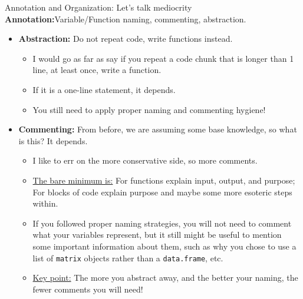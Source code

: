 \documentclass[aspectratio=169,xcolor=dvipsnames]{beamer}\usepackage[]{graphicx}\usepackage[]{color}
\begin{document}
\begin{frame}[t]{Annotation and Organization: Let's talk mediocrity}
  \textbf{Annotation:}\pause Variable/Function naming, commenting, abstraction.\pause
  \begin{itemize}
    \item \textbf{Abstraction:} \alert{Do not repeat code}, write functions instead.\pause
    \begin{itemize}
      \item I would go as far as say if you repeat a code chunk that is longer than 1 line, at least once, write a function.
      \item If it is a one-line statement, it depends.\pause
      \item \alert{You still need to apply proper naming and commenting hygiene!} \pause
    \end{itemize}
    \item \textbf{Commenting:} From before, we are assuming some base knowledge, so what is this? \pause It depends.\pause
    \begin{itemize}
      \item I like to err on the more conservative side, so more comments.\pause
      \item \underline{The bare minimum is:} For functions \alert{explain input, output, and purpose}; For blocks of code explain purpose and maybe some more esoteric steps within.\pause
      \item If you followed proper naming strategies, you will not need to comment what your variables represent, but it still might be useful to mention some important information about them, such as why you chose to use a list of \texttt{matrix} objects rather than a \texttt{data.frame}, etc.\pause
      \item \underline{Key point:} The more you abstract away, and the better your naming, the fewer comments you will need!
    \end{itemize}
  \end{itemize}

\end{frame}

\end{document}
